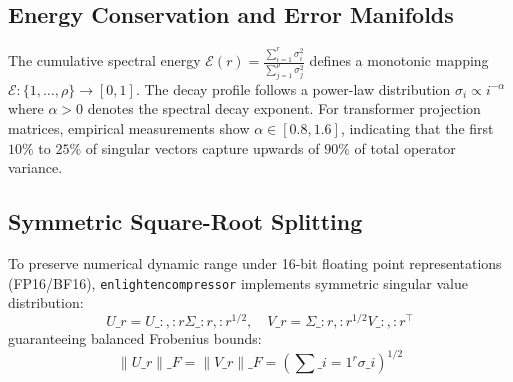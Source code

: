 \subsection{Energy Conservation and Error Manifolds}
The cumulative spectral energy $\mathcal{E}(r) = \frac{\sum_{i=1}^r \sigma_i^2}{\sum_{j=1}^\rho \sigma_j^2}$ defines a monotonic mapping $\mathcal{E}: \{1, \dots, \rho\} \to [0, 1]$. The decay profile follows a power-law distribution $\sigma_i \propto i^{-\alpha}$ where $\alpha > 0$ denotes the spectral decay exponent. For transformer projection matrices, empirical measurements show $\alpha \in [0.8, 1.6]$, indicating that the first $10\%$ to $25\%$ of singular vectors capture upwards of $90\%$ of total operator variance.

\subsection{Symmetric Square-Root Splitting}
To preserve numerical dynamic range under 16-bit floating point representations (FP16/BF16), \texttt{enlightencompressor} implements symmetric singular value distribution:
\[
U\_r = U\_{:, :r} \Sigma\_{:r, :r}^{1/2}, \quad V\_r = \Sigma\_{:r, :r}^{1/2} V\_{:, :r}^\top
\]
guaranteeing balanced Frobenius bounds:
\[
\|U\_r\|\_F = \|V\_r\|\_F = \left( \sum\_{i=1}^{r} \sigma\_i \right)^{1/2}
\]
